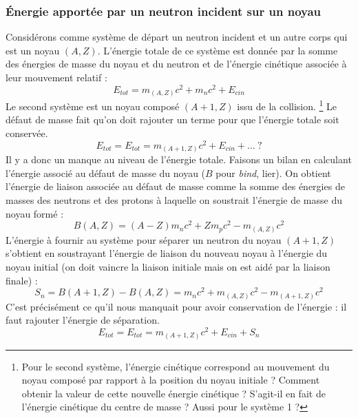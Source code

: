 \subsubsection{Énergie apportée par un neutron incident sur un noyau}
Considérons comme système de départ un neutron incident et un autre corps qui est un noyau $(A,Z)$.
L'énergie totale de ce système est donnée par la somme des énergies de masse du noyau et du neutron
et de l'énergie cinétique associée à leur mouvement relatif :
\begin{equation}
E_{tot} = m_{(A,Z)}c^2 + m_nc^2+E_{cin}
\end{equation}
Le second système est un noyau composé $(A+1, Z)$ issu de la collision.
\footnote{Pour le second système, l'énergie cinétique correspond au mouvement du noyau composé
par rapport à la position du noyau initiale ? Comment obtenir la valeur de cette nouvelle énergie cinétique ?
S'agit-il en fait de l'énergie cinétique du centre de masse ? Aussi pour le système 1 ?}
Le défaut de masse fait qu'on doit rajouter un terme pour que l'énergie totale soit conservée.
\begin{equation}
E_{tot}=E_{tot} = m_{(A+1,Z)}c^2 +E_{cin}+\dots\ ? 
\end{equation}
Il y a donc un manque au niveau de l'énergie totale. Faisons un bilan en calculant l'énergie 
associé au défaut de masse du noyau ($B$ pour \textit{bind}, lier).
On obtient l'énergie de liaison associée au défaut de masse comme la somme des énergies de 
masses des neutrons et des protons à laquelle on soustrait l'énergie de masse du noyau formé :
\begin{equation}
B(A,Z) = (A-Z)m_nc^2+Zm_pc^2 - m_{(A,Z)}c^2
\end{equation}
L'énergie à fournir au système pour séparer un neutron du noyau $(A+1,Z)$ s'obtient en soustrayant l'énergie de liaison
du nouveau noyau à l'énergie du noyau initial (on doit vaincre la liaison initiale mais on est aidé par la liaison finale) :
\begin{equation}
S_n = B(A+1,Z)-B(A,Z) = m_nc^2+m_{(A,Z)}c^2-m_{(A+1,Z)}c^2
\end{equation}
C'est précisément ce qu'il nous manquait pour avoir conservation de l'énergie : il faut 
rajouter l'énergie de séparation.
\begin{equation}
E_{tot}=E_{tot} = m_{(A+1,Z)}c^2 +E_{cin}+S_n
\end{equation}

